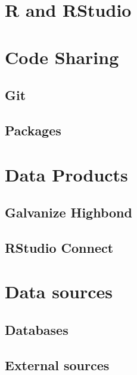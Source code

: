 \documentclass[
]{book}
\begin{document}
\hypertarget{r-and-rstudio}{%
\section{R and RStudio}\label{r-and-rstudio}}

\hypertarget{code-sharing}{%
\section{Code Sharing}\label{code-sharing}}

\hypertarget{git}{%
\subsection{Git}\label{git}}

\hypertarget{packages}{%
\subsection{Packages}\label{packages}}

\hypertarget{data-products}{%
\section{Data Products}\label{data-products}}

\hypertarget{galvanize-highbond}{%
\subsection{Galvanize Highbond}\label{galvanize-highbond}}

\hypertarget{rstudio-connect}{%
\subsection{RStudio Connect}\label{rstudio-connect}}

\hypertarget{data-sources}{%
\section{Data sources}\label{data-sources}}

\hypertarget{databases}{%
\subsection{Databases}\label{databases}}

\hypertarget{external-sources}{%
\subsection{External sources}\label{external-sources}}
\end{document}
